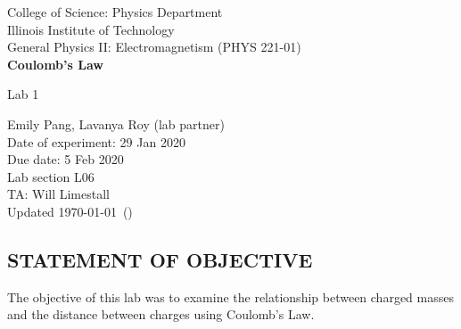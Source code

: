 \documentclass [12pt, letterpaper, twoside] {article}
\begin{document}
\begin {titlepage}
\begin {center}
College of Science: Physics Department \\
\vspace {0.1cm}
Illinois Institute of Technology\\
\vspace {0.1cm}
General Physics II: Electromagnetism (PHYS 221-01)\\
\vspace* {\fill}
\begingroup
\Large
\textbf {Coulomb's Law}
\vspace {0.35cm}

\normalsize
Lab 1
\vspace {1.5cm}
\endgroup
\vspace* {\fill}
\end {center}

\vspace*{\fill}
\begin {flushright}
\footnotesize
Emily Pang, Lavanya Roy (lab partner) \\
Date of experiment: 29 Jan 2020 \\
Due date: 5 Feb 2020 \\
Lab section L06 \\
TA: Will Limestall \\
Updated \usdate\today~(\currenttime)
\end {flushright}
\end {titlepage}

\subsection* {STATEMENT OF OBJECTIVE}
The objective of this lab was to examine the relationship between charged masses and the distance between charges using Coulomb's Law.
\end{document}
